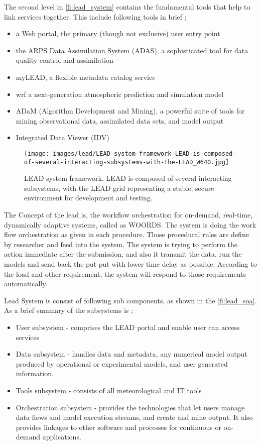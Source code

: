 \documentclass[a4paper,oneside,12pt]{report}
\begin{document}
The second level in \ref{fi:lead_system} contains the fundamental tools that help to link services together. This include following tools in brief \cite{Droegemeier2005Service-OrientedWeather};
\begin{itemize}
    \item a Web portal, the primary (though not exclusive) user entry point
    \item the ARPS Data Assimilation System (ADAS), a sophisticated tool for data quality control and assimilation
    \item myLEAD, a flexible metadata catalog service
    \item \acrfull{wrf} a next-generation atmospheric prediction and simulation model
    \item ADaM (Algorithm Development and Mining), a powerful suite of tools for mining observational data, assimilated data sets, and model output 
    \item Integrated Data Viewer (IDV) 
\end{itemize}

\begin{figure}[htp]
    \centering
    \texttt{[image: images/lead/LEAD-system-framework-LEAD-is-composed-of-several-interacting-subsystems-with-the-LEAD\_W640.jpg]}\\
    \caption{ LEAD system framework. LEAD is composed of several interacting subsystems, with the LEAD grid representing a stable, secure environment for development and testing. \cite{Droegemeier2005Service-OrientedWeather} }
    \label{fi:lead_framework}
\end{figure}

The Concept of the \acrshort{lead} is, the workflow orchestration for on-demand, real-time, dynamically adaptive systems, called as WOORDS. The system is doing the work flow orchestration as given in each procedure. Those procedural rules are define by researcher and feed into the system. The system is trying to perform the action immediate after the submission, and also it transmit the data, run the models and send back the put put with lower time delay as possible. According to the load and other requirement, the system will respond to those requirements automatically.

Lead System is consist of following sub components, as shown in the \ref{fi:lead_soa}. As a brief summary of the subsystems is \cite{Droegemeier2005Service-OrientedWeather};
\begin{itemize}
\item User subsystem - comprises the LEAD portal and enable user can access services
\item Data subsystem - handles data and metadata, any numerical model output produced by operational or experimental models, and user generated information.
\item Tools subsystem - consists of all meteorological and IT tools
\item Orchestration subsystem - provides the technologies that let users manage data flows and model execution streams, and create and mine output. It also provides linkages to other software and processes for continuous or on-demand applications. 
\end{itemize}
\end{document}
